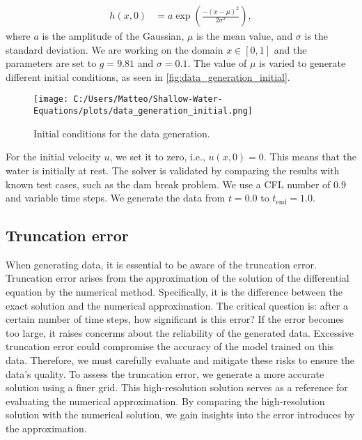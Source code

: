 \begin{align}\label{eq:1D_swe_ic_gaussian}
    h(x,0) &= a \exp{\left(\frac{-{(x-\mu)}^2}{2\sigma^2}\right)},
\end{align}
where $a$ is the amplitude of the Gaussian, $\mu$ is the mean value, and $\sigma$ is the standard deviation.
We are working on the domain $x \in [0,1]$ and the parameters are set to $g = 9.81$ and $\sigma = 0.1$.
The value of $\mu$ is varied to generate different initial conditions, as seen in \autoref{fig:data_generation_initial}.
\begin{figure}[H]
    \centering
    \texttt{[image: C:/Users/Matteo/Shallow-Water-Equations/plots/data\_generation\_initial.png]}
    \caption{Initial conditions for the data generation.}\label{fig:data_generation_initial}
\end{figure}
For the initial velocity $u$, we set it to zero, i.e., $u(x,0) = 0$. This means that the water is initially at rest.
The solver is validated by comparing the results with known test cases, such as the dam break problem.
We use a CFL number of $0.9$ and variable time steps.
We generate the data from $t = 0.0$ to $t_{\text{end}} = 1.0$.

\subsection*{Truncation error}
When generating data, it is essential to be aware of the truncation error.
Truncation error arises from the approximation of the solution of the differential equation by the numerical method.
Specifically, it is the difference between the exact solution and the numerical approximation.
The critical question is: after a certain number of time steps, how significant is this error?
If the error becomes too large, it raises concerms about the reliability of the generated data.
Excessive truncation error could compromise the accuracy of the model trained on this data.
Therefore, we must carefully evaluate and mitigate these risks to ensure the data's quality.
To assess the truncation error, we generate a more accurate solution using a finer grid.
This high-resolution solution serves as a reference for evaluating the numerical approximation.
By comparing the high-resolution solution with the numerical solution, we gain insights into the error introduces by the approximation.

